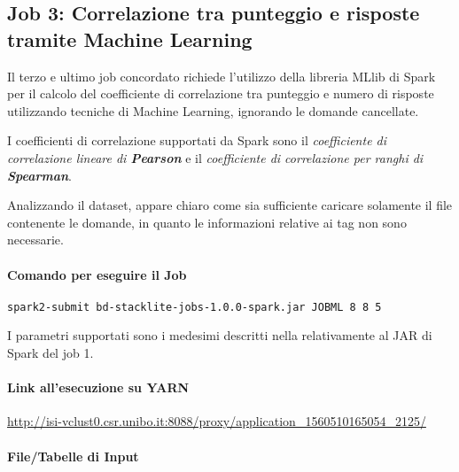 

\subsection[%
    Job 3: Correlazione tra punteggio e risposte%
  ]{%
    Job 3: Correlazione tra punteggio e risposte tramite Machine Learning%
  }\label{subsec:job3}

  Il terzo e ultimo job concordato richiede l'utilizzo della libreria MLlib di Spark per il calcolo del coefficiente di correlazione
  tra punteggio e numero di risposte utilizzando tecniche di Machine Learning, ignorando le domande cancellate.

  I coefficienti di correlazione supportati da Spark sono il \textit{coefficiente di correlazione lineare di \textbf{Pearson}} e il \textit{coefficiente di correlazione per ranghi di \textbf{Spearman}}.

  Analizzando il dataset, appare chiaro come sia sufficiente caricare solamente il file contenente le domande, in quanto le informazioni relative ai tag non sono necessarie.

  \paragraph{Comando per eseguire il Job}\label{par:job3:cmd}

  \texttt{spark2-submit bd-stacklite-jobs-1.0.0-spark.jar JOBML 8 8 5}

  I parametri supportati sono i medesimi descritti nella  relativamente al JAR di Spark del job 1.

  \paragraph{Link all'esecuzione su YARN}\label{par:job3:yarn}

  \url{http://isi-vclust0.csr.unibo.it:8088/proxy/application_1560510165054_2125/}

  \paragraph{File/Tabelle di Input}\label{par:job3:input}

